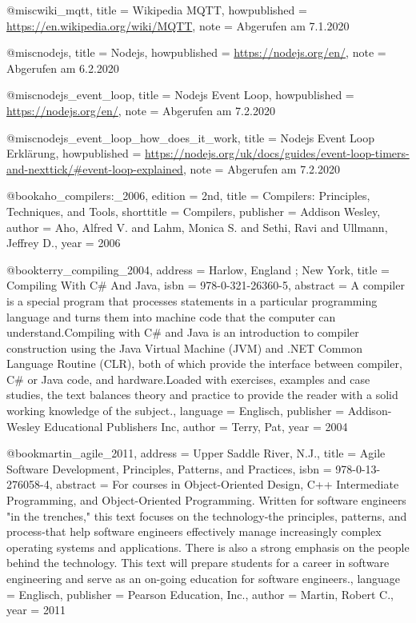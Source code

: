 @misc{wiki_mqtt, 
		title  = {{Wikipedia MQTT}},
		howpublished = {\newline  \url{https://en.wikipedia.org/wiki/MQTT}},
		note  =  {\newline Abgerufen am 7.1.2020}
}

@misc{nodejs, 
		title  = {{Nodejs}},
		howpublished = {\newline  \url{https://nodejs.org/en/}},
		note  =  {\newline Abgerufen am 6.2.2020}
}

@misc{nodejs_event_loop, 
		title  = {{Nodejs Event Loop}},
		howpublished = {\newline  \url{https://nodejs.org/en/}},
		note  =  {\newline Abgerufen am 7.2.2020}
}

@misc{nodejs_event_loop_how_does_it_work, 
		title  = {{Nodejs Event Loop Erklärung}},
		howpublished = {\newline  \url{https://nodejs.org/uk/docs/guides/event-loop-timers-and-nexttick/#event-loop-explained}},
		note  =  {\newline Abgerufen am 7.2.2020}
}

@book{aho_compilers:_2006,
	edition = {2nd},
	title = {Compilers: {Principles}, {Techniques}, and {Tools}},
	shorttitle = {Compilers},
	publisher = {Addison Wesley},
	author = {Aho, Alfred V. and Lahm, Monica S. and Sethi, Ravi and Ullmann, Jeffrey D.},
	year = {2006}
}

@book{terry_compiling_2004,
	address = {Harlow, England ; New York},
	title = {Compiling {With} {C}\# {And} {Java}},
	isbn = {978-0-321-26360-5},
	abstract = {A compiler is a special program that processes statements in a particular programming language and turns them into machine code that the computer can understand.Compiling with C\# and Java is an introduction to compiler construction using the Java Virtual Machine (JVM) and .NET Common Language Routine (CLR), both of which provide the interface between compiler, C\# or Java code, and hardware.Loaded with exercises, examples and case studies, the text balances theory and practice to provide the reader with a solid working knowledge of the subject.},
	language = {Englisch},
	publisher = {Addison-Wesley Educational Publishers Inc},
	author = {Terry, Pat},
	year = {2004}
}

@book{martin_agile_2011,
	address = {Upper Saddle River, N.J.},
	title = {Agile {Software} {Development}, {Principles}, {Patterns}, and {Practices}},
	isbn = {978-0-13-276058-4},
	abstract = {For courses in Object-Oriented Design, C++ Intermediate Programming, and Object-Oriented Programming.  Written for software engineers "in the trenches," this text focuses on the technology-the principles, patterns, and process-that help software engineers effectively manage increasingly complex operating systems and applications. There is also a strong emphasis on the people behind the technology. This text will prepare students for a career in software engineering and serve as an on-going education for software engineers.},
	language = {Englisch},
	publisher = {Pearson Education, Inc.},
	author = {Martin, Robert C.},
	year = {2011}
}

